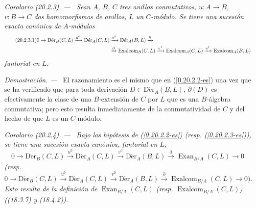 \documentclass[10pt,oneside]{book}
\makeatletter
\newcommand{\sref}[1]{\textup{(\ref{#1})}}
\newcommand{\setmanualcurrentlabel}[1]{\def\@currentlabel{#1}}
\newcommand{\oldpage}[2][]{%
  \setcounter{footnote}{0}%
  \marginpar{\scriptsize\textbf{#1}~|~#2}\ignorespaces}
\newenvironment{corollary}[1][]{%
  \setmanualcurrentlabel{#1}\par\medskip\noindent\itshape Corolario (#1). ---\ }{\par}
\newenvironment{proof}{%
  \par\medskip\noindent\textit{Demostración. ---\ }}{\par}
\makeatother
\begin{document}
\oldpage[0\textsubscript{IV-1}]{121}
\begin{corollary}[20.2.3]
\label{0.20.2.3-es}
Sean $A$, $B$, $C$ tres anillos conmutativos, $u:A\to B$, $v:B\to C$
dos homomorfismos de anillos, $L$ un $C$-módulo. Se tiene una sucesión exacta
canónica de $A$-módulos
\begin{align}
\tag{20.2.3.1}
\label{0.20.2.3.1-es}
  0\to\operatorname{D\acute{e}r}_B(C,L)\xrightarrow{u^0}
  \operatorname{D\acute{e}r}_A(C,L)&\xrightarrow{v^0}
  \operatorname{D\acute{e}r}_A(B,L)\xrightarrow{\partial} \\
  &\xrightarrow{\partial}\operatorname{Exalcom}_B(C,L)\xrightarrow{u^1}
  \operatorname{Exalcom}_A(C,L)\xrightarrow{v^1}
  \operatorname{Exalcom}_A(B,L) \notag
\end{align}
funtorial en $L$.
\end{corollary}

\begin{proof}
El razonamiento es el mismo que en \sref{0.20.2.2-es} una vez que se ha
verificado que para toda derivación $D\in\operatorname{D\acute{e}r}_A(B,L)$,
$\partial(D)$ es efectivamente la clase de una $B$-extensión de $C$ por $L$ que es
una $B$-álgebra conmutativa; pero esto resulta inmediatamente de la conmutatividad
de $C$ y del hecho de que $L$ es un $C$-módulo.
\end{proof}

\begin{corollary}[20.2.4]
\label{0.20.2.4-es}
Bajo las hipótesis de \sref{0.20.2.2-es} \textup{(resp.
\sref{0.20.2.3-es})}, se tiene una sucesión exacta canónica, funtorial en $L$,
\begin{equation}
\tag{20.2.4.1}
\label{0.20.2.4.1-es}
  0\to\operatorname{D\acute{e}r}_B(C,L)\xrightarrow{u^0}
  \operatorname{D\acute{e}r}_A(C,L)\xrightarrow{v^0}
  \operatorname{D\acute{e}r}_A(B,L)\xrightarrow{\partial}
  \operatorname{Exan}_{B/A}(C,L)\to0
\end{equation}
\textup{(resp.}
\begin{equation}
\tag{20.2.4.2}
\label{0.20.2.4.2-es}
  0\to\operatorname{D\acute{e}r}_B(C,L)\xrightarrow{u^0}
  \operatorname{D\acute{e}r}_A(C,L)\xrightarrow{v^0}
  \operatorname{D\acute{e}r}_A(B,L)\xrightarrow{\partial}
  \operatorname{Exalcom}_{B/A}(C,L)\to0\text{).}
\end{equation}
Esto resulta de la definición de $\operatorname{Exan}_{B/A}(C,L)$ (resp.
$\operatorname{Exalcom}_{B/A}(C,L)$) ((18.3.7) y (18.4.2)).
\end{corollary}
\end{document}
